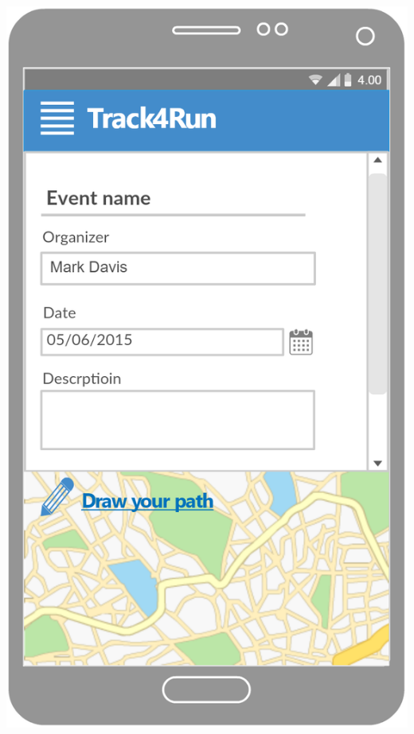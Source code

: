 \begin{center}
\begin{minipage}[c]{.40\textwidth}
\includegraphics[width=1\textwidth]{Images/userInterface/AddEvent}
\end{minipage}
\end{center}

